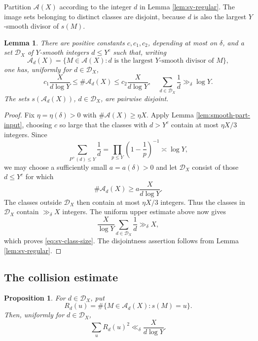 \documentclass[11pt,letterpaper,reqno]{amsart}
\numberwithin{equation}{section}
\newtheorem{lemma}[theorem]{Lemma}
\newtheorem{proposition}[theorem]{Proposition}
\theoremstyle{remark}
\newcommand{\1}{\mathbf 1}
\renewcommand{\leq}{\leqslant}
\renewcommand{\geq}{\geqslant}
\begin{document}
Partition $\mathcal{A}(X)$ according to the integer $d$ in
Lemma \ref{lem:sv-regular}. The image sets belonging to distinct classes
are disjoint, because $d$ is also the largest $Y$-smooth divisor of $s(M)$.

\begin{lemma}\label{lem:sv-classes}
There are positive constants $c,c_1,c_2$, depending at most on $\delta$, and a set $\mathcal{D}_X$ of $Y$-smooth
integers $d\leq Y^c$ such that, writing
\[
 \mathcal{A}_d(X)=\{M\in\mathcal{A}(X):d
 \text{ is the largest $Y$-smooth divisor of }M\},
\]
one has, uniformly for $d\in\mathcal{D}_X$,
\begin{equation}\label{eq:sv-class-size}
 c_1\frac{X}{d\log Y}
 \leq\#\mathcal{A}_d(X)
 \leq c_2\frac{X}{d\log Y},
 \quad
 \sum_{d\in\mathcal{D}_X}\frac1d\gg_\delta\log Y.
\end{equation}
The sets $s(\mathcal{A}_d(X))$, $d\in\mathcal{D}_X$, are pairwise disjoint.
\end{lemma}

\begin{proof}
Fix $\eta=\eta(\delta)>0$ with $\#\mathcal{A}(X)\geq\eta X$.
Apply Lemma \ref{lem:smooth-part-input}, choosing $c$ so large that the
classes with $d>Y^c$ contain at most $\eta X/3$ integers. Since
\[
 \sum_{P^+(d)\leq Y}\frac1d
 =\prod_{p\leq Y}\left(1-\frac1p\right)^{-1}
 \asymp\log Y,
\]
we may choose a sufficiently small $a=a(\delta)>0$ and let $\mathcal{D}_X$
consist of those $d\leq Y^c$ for which
\[
 \#\mathcal{A}_d(X)\geq a\frac{X}{d\log Y}.
\]
The classes outside $\mathcal{D}_X$ then contain at most $\eta X/3$ integers.
Thus the classes in $\mathcal{D}_X$ contain $\gg_\delta X$ integers. The
uniform upper estimate above now gives
\[
 \frac{X}{\log Y}\sum_{d\in\mathcal{D}_X}\frac1d
 \gg_\delta X,
\]
which proves \eqref{eq:sv-class-size}. The disjointness assertion follows
from Lemma \ref{lem:sv-regular}.
\end{proof}

\subsection{The collision estimate}

\begin{proposition}\label{prop:sv-second-moment}
For $d\in\mathcal{D}_X$, put
\[
 R_d(u)=\#\{M\in\mathcal{A}_d(X):s(M)=u\}.
\]
Then, uniformly for $d\in\mathcal{D}_X$,
\begin{equation}\label{eq:sv-second-moment}
 \sum_uR_d(u)^2\ll_\delta\frac{X}{d\log Y}.
\end{equation}
\end{proposition}
\end{document}
